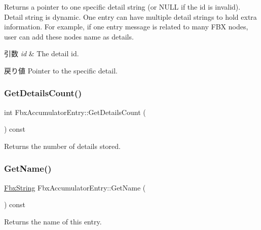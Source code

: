 Returns a pointer to one specific detail string (or N\+U\+LL if the id is invalid). Detail string is dynamic. One entry can have multiple detail strings to hold extra information. For example, if one entry message is related to many F\+BX nodes, user can add these nodes\textquotesingle{} name as details. 
\begin{DoxyParams}{引数}
{\em id} & The detail id. \\
\hline
\end{DoxyParams}
\begin{DoxyReturn}{戻り値}
Pointer to the specific detail. 
\end{DoxyReturn}
\mbox{\label{class_fbx_accumulator_entry_adc709cecc41aa46b5874877c49f99b19}} 
\subsubsection{\texorpdfstring{Get\+Details\+Count()}{GetDetailsCount()}}
{\footnotesize\ttfamily int Fbx\+Accumulator\+Entry\+::\+Get\+Details\+Count (\begin{DoxyParamCaption}{ }\end{DoxyParamCaption}) const}



Returns the number of details stored. 

\mbox{\label{class_fbx_accumulator_entry_a0dbcb9bc95c823b84a8679f781d35317}} 
\subsubsection{\texorpdfstring{Get\+Name()}{GetName()}}
{\footnotesize\ttfamily \hyperlink{class_fbx_string}{Fbx\+String} Fbx\+Accumulator\+Entry\+::\+Get\+Name (\begin{DoxyParamCaption}{ }\end{DoxyParamCaption}) const}



Returns the name of this entry. 

\mbox{\label{class_fbx_accumulator_entry_ac7c575cce1b36df854f30ed8beb82260}} 
